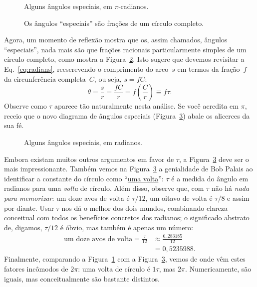 \begin{figure}
\begin{center}
\end{center}
\caption{Alguns ângulos especiais, em $\pi$-radianos.\label{fig:pi_angles}}
\end{figure}

\begin{figure}
\begin{center}
\end{center}
\caption{Os ângulos ``especiais'' são frações de um círculo completo.\label{fig:angle_fractions}}
\end{figure}

Agora, um momento de reflexão mostra que os, assim chamados, ângulos ``especiais'', nada mais são que frações racionais particularmente simples de um círculo completo, como mostra a Figura~\ref{fig:angle_fractions}. Isto sugere que devemos revisitar a Eq.~\eqref{eq:radians}, reescrevendo o comprimento do arco~$s$ em termos da fração~$f$ da circunferência completa~$C$, ou seja, $s = f C$:
\[ \theta = \frac{s}{r} = \frac{fC}{r} =  f\left(\frac{C}{r}\right) \equiv f\tau. \]
Observe como $\tau$ aparece tão naturalmente nesta análise. Se você acredita em $\pi$, receio que o novo diagrama de ângulos especiais (Figura~\ref{fig:tau_angles}) abale os alicerces da sua fé.

\begin{figure}
\begin{center}
\end{center}
\caption{Alguns ângulos especiais, em radianos.\label{fig:tau_angles}}
\end{figure}

Embora existam muitos outros argumentos em favor de $\tau$, a Figura~\ref{fig:tau_angles} deve ser o mais impressionante. Também vemos na Figura~\ref{fig:tau_angles} a genialidade de Bob Palais ao identificar a constante do círculo como ``\href{https://pt.wikipedia.org/wiki/Volta_(geometria)}{uma volta}'': $\tau$ é a medida do ângulo em radianos para uma \emph{volta} de círculo. Além disso, observe que, com $\tau$ não há \emph{nada para memorizar}: um doze avos de volta é $\tau/12$, um oitavo de volta é $\tau/8$ e assim por diante. Usar $\tau$ nos dá o melhor dos dois mundos, combinando clareza conceitual com todos os benefícios concretos dos radianos; o significado abstrato de, digamos, $\tau/12$ é óbvio, mas também é apenas um número:
\[
\begin{split}
\mbox{um doze avos de volta} = \frac{\tau}{12} & \approx \frac{6,283185}{12} \\
                                             & = 0,5235988.
\end{split}
\]
Finalmente, comparando a Figura~\ref{fig:pi_angles} com a Figura~\ref{fig:tau_angles}, vemos de onde vêm estes fatores incômodos de $2\pi$: uma volta de círculo é $1\tau$, mas $2\pi$. Numericamente, são iguais, mas conceitualmente são bastante distintos.

